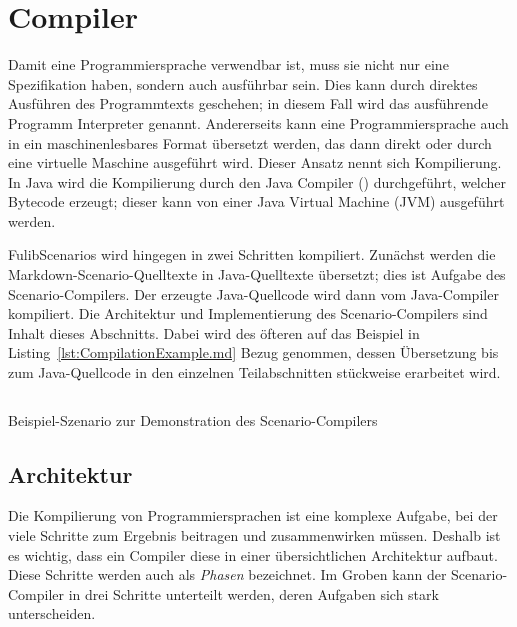 \section{Compiler}\label{sec:compiler}

Damit eine Programmiersprache verwendbar ist, muss sie nicht nur eine Spezifikation haben, sondern auch ausführbar sein.
Dies kann durch direktes Ausführen des Programmtexts geschehen;
in diesem Fall wird das ausführende Programm Interpreter genannt.
Andererseits kann eine Programmiersprache auch in ein maschinenlesbares Format übersetzt werden,
das dann direkt oder durch eine virtuelle Maschine ausgeführt wird.
Dieser Ansatz nennt sich Kompilierung.
In Java wird die Kompilierung durch den Java Compiler () durchgeführt, welcher Bytecode erzeugt;
dieser kann von einer Java Virtual Machine (JVM) ausgeführt werden.

FulibScenarios wird hingegen in zwei Schritten kompiliert.
Zunächst werden die Markdown-Scenario-Quelltexte in Java-Quelltexte übersetzt;
dies ist Aufgabe des Scenario-Compilers.
Der erzeugte Java-Quellcode wird dann vom Java-Compiler kompiliert.
Die Architektur und Implementierung des Scenario-Compilers sind Inhalt dieses Abschnitts.
Dabei wird des öfteren auf das Beispiel in Listing~\ref{lst:CompilationExample.md} Bezug genommen,
dessen Übersetzung bis zum Java-Quellcode in den einzelnen Teilabschnitten stückweise erarbeitet wird.

\begin{listing}[htp]
    \centering
    \inputminted{md}{chapter/fulib-scenarios/scenarios/CompilationExample.md}
    \vspace{-3ex}
    \caption{Beispiel-Szenario zur Demonstration des Scenario-Compilers}
    \label{lst:CompilationExample.md}
\end{listing}

\subsection{Architektur}\label{subsec:compiler-architecture}

Die Kompilierung von Programmiersprachen ist eine komplexe Aufgabe,
bei der viele Schritte zum Ergebnis beitragen und zusammenwirken müssen.
Deshalb ist es wichtig, dass ein Compiler diese in einer übersichtlichen Architektur aufbaut.
Diese Schritte werden auch als \emph{Phasen}\cite[4]{dragonbook} bezeichnet.
Im Groben kann der Scenario-Compiler in drei Schritte unterteilt werden,
deren Aufgaben sich stark unterscheiden.

